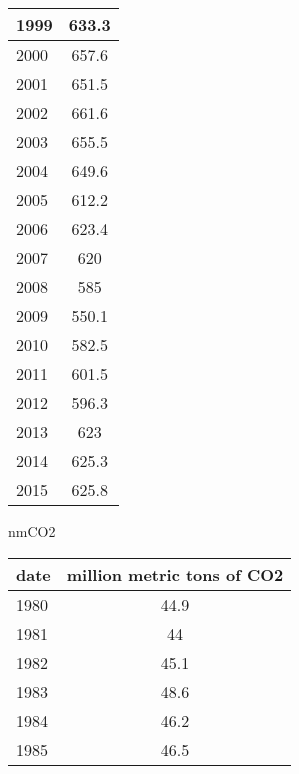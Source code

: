 \documentclass{mcmthesis}
\begin{document}
\begin{appendices}
\begin{minipage}{\textwidth}
\begin{minipage}[t]{0.45\textwidth}
\begin{tabular}{|l|c|}
        1999 & 633.3                      \\ \hline
        2000 & 657.6                      \\ \hline
        2001 & 651.5                      \\ \hline
        2002 & 661.6                      \\ \hline
        2003 & 655.5                      \\ \hline
        2004 & 649.6                      \\ \hline
        2005 & 612.2                      \\ \hline
        2006 & 623.4                      \\ \hline
        2007 & 620                        \\ \hline
        2008 & 585                        \\ \hline
        2009 & 550.1                      \\ \hline
        2010 & 582.5                      \\ \hline
        2011 & 601.5                      \\ \hline
        2012 & 596.3                      \\ \hline
        2013 & 623                        \\ \hline
        2014 & 625.3                      \\ \hline
        2015 & 625.8                      \\ \hline
        \end{tabular}
    \end{minipage}
    \begin{minipage}[t]{0.45\textwidth}
    \centering
          \makeatletter{}\makeatother\caption{nmCO2}
          \begin{tabular}{|l|c|}
            \hline
            date & million metric tons of CO2 \\ \hline
            1980 & 44.9                       \\ \hline
            1981 & 44                         \\ \hline
            1982 & 45.1                       \\ \hline
            1983 & 48.6                       \\ \hline
            1984 & 46.2                       \\ \hline
            1985 & 46.5                       \\ \hline

\end{tabular}
\end{minipage}
\end{minipage}
\end{appendices}
\end{document}
